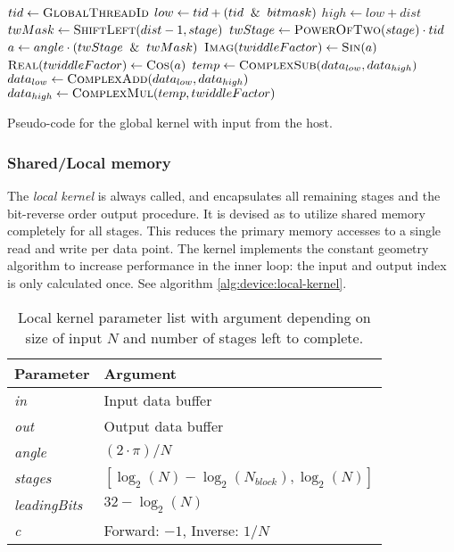 \begin{algorithm}
	\centering
	\begin{algorithmic}[1]
            \State $tid \gets \Call{GlobalThreadId}{}$ 
            \State $low \gets tid + (tid \And bitmask)$
            \State $high \gets low + dist$
            \State $twMask \gets \Call{ShiftLeft}{dist - 1, stage}$
            \State $twStage \gets \Call{PowerOfTwo}{stage} \cdot tid$
            \State $a \gets angle \cdot (twStage \And twMask)$
            \State $\Call{Imag}{twiddleFactor} \gets \Call{Sin}{a}$
            \State $\Call{Real}{twiddleFactor} \gets \Call{Cos}{a}$
            \State $temp \gets \Call{ComplexSub}{data_{low}, data_{high}}$
            \State $data_{low} \gets \Call{ComplexAdd}{data_{low}, data_{high}}$
            \State $data_{high} \gets \Call{ComplexMul}{temp, twiddleFactor}$
        \EndProcedure
	\end{algorithmic}
	\caption{Pseudo-code for the global kernel with input from the host.}
	\label{alg:device:global-kernel}
\end{algorithm}

\subsubsection{Shared/Local memory}

The \textit{local kernel} is always called, and encapsulates all remaining stages and the bit-reverse order output procedure. It is devised as to utilize shared memory completely for all stages. This reduces the primary memory accesses to a single read and write per data point. The kernel implements the constant geometry algorithm to increase performance in the inner loop: the input and output index is only calculated once. See algorithm \ref{alg:device:local-kernel}.

\begin{table}
	\centering
	\begin{tabular}{|l|l|}
		\hline
		Parameter & Argument \\ \hline
		\textit{in} & Input data buffer \\ \hline
		\textit{out} & Output data buffer \\ \hline
		\textit{angle} & $(2 \cdot \pi)/N$ \\ \hline
		\textit{stages} & $[\log_{2}(N) - \log_{2}(N_{block}), \log_{2}(N)]$ \\ \hline
		\textit{leadingBits} & $32 - \log_{2}(N)$ \\ \hline
		\textit{c} & Forward: $-1$, Inverse: $1/N$ \\ \hline
	\end{tabular}
	\caption{Local kernel parameter list with argument depending on size of input $N$ and number of stages left to complete.}
	\label{tab:local-kernel}
\end{table}

